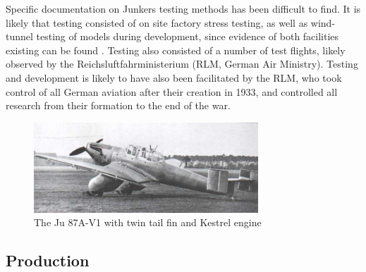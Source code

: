 \documentclass[a4paper, fontsize=11pt]{scrartcl} %
\begin{document}
Specific documentation on Junkers testing methods has been difficult to
find. It is likely that testing consisted of on site
factory stress testing, as well as wind-tunnel testing of models during
development, since evidence of both facilities existing can be found
\autocite{hirschel03}. Testing also consisted of a number of test
flights, likely observed by the Reichsluftfahrministerium (RLM, German
Air Ministry). Testing and development is likely to have also been
facilitated by the RLM, who took control of all German aviation after their creation
in 1933, and controlled all research from their formation to the end of
the war.

\begin{figure}[h]
  \centering
  \includegraphics[width=0.75\textwidth]{media/ju87av0}
  \caption{The Ju 87A-V1 with twin tail fin and Kestrel engine
    \autocite{junkers87}}
  \label{fig:v1}
\end{figure}
\subsection{Production}
\printbibliography
\end{document}
